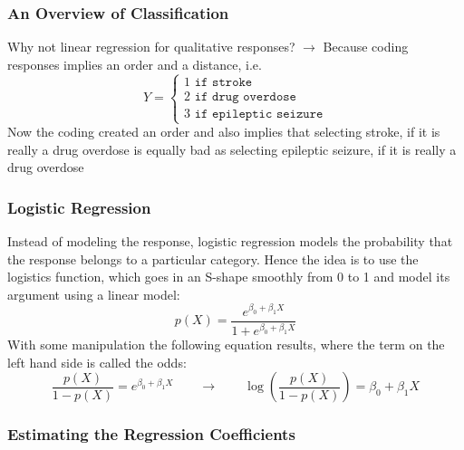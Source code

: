 \subsubsection{An Overview of Classification}
Why not linear regression for qualitative responses? $\rightarrow$ Because  coding  responses  implies  an order  and  a  distance, i.e.
\[ Y = \begin{cases}
1\texttt{ if stroke} \\ 2\texttt{ if drug overdose} \\ 3\texttt{ if epileptic seizure}
\end{cases}  \]
Now the coding created an  order and also implies that  selecting  stroke,  if  it  is  really  a drug  overdose  is  equally  bad  as  selecting epileptic  seizure,  if  it  is  really  a  drug overdose \\

\subsubsection{Logistic Regression}
Instead of modeling the response, logistic regression models the probability that the response belongs to a particular category.
Hence the idea is to use the logistics function, which goes in an S-shape smoothly from 0 to 1 and model  its argument using a linear model:
\[ p(X) = \frac{e^{\beta_0+\beta_1X}}{1+e^{\beta_0+\beta_1X}}  \]
With some manipulation the following equation results, where the term on the left hand side is called the  odds:
\[ \frac{p(X)}{1-p(X)} = e^{\beta_0+\beta_1X} \qquad \rightarrow \qquad \log \left( \frac{p(X)}{1-p(X)} \right) = \beta_0+\beta_1X\]

\subsubsection{Estimating the Regression Coefficients}
